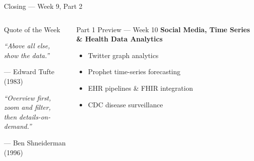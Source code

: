 \documentclass[aspectratio=169,10pt]{beamer}
\begin{document}
\begin{frame}{Closing — Week 9, Part 2}
\begin{columns}[T]
      \begin{alertblock}{Quote of the Week}
        \begin{center}
        \large\itshape
        ``Above all else, show the data.''
        \end{center}
        \begin{flushright}
        \small --- Edward Tufte (1983)
        \end{flushright}
        \vspace{8pt}
        \begin{center}
        \large\itshape
        ``Overview first,\\
        zoom and filter,\\
        then details-on-demand.''
        \end{center}
        \begin{flushright}
        \small --- Ben Shneiderman (1996)
        \end{flushright}
      \end{alertblock}
      \vspace{4pt}
      \begin{exampleblock}{Part 1 Preview — Week 10}
        \textbf{Social Media, Time Series \& Health Data Analytics}\\[3pt]
        \begin{itemize}\setlength\itemsep{1pt}
          \item Twitter graph analytics
          \item Prophet time-series forecasting
          \item EHR pipelines \& FHIR integration
          \item CDC disease surveillance
        \end{itemize}
      \end{exampleblock}
  \end{columns}
\end{frame}

\end{document}
